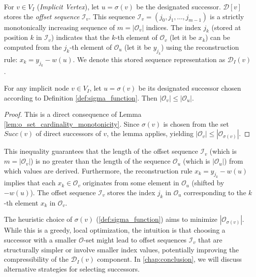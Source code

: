For $v \in V_I$ (\emph{Implicit Vertex}), let $u = \sigma(v)$ be the designated successor. $\mathcal{D}[v]$ stores the \emph{offset sequence} $\mathcal{I}_v$. This sequence $\mathcal{I}_v = (j_0, j_1, \dots, j_{m-1})$ is a strictly monotonically increasing sequence of $m = |\mathcal{O}_v|$ indices. The index $j_k$ (stored at position $k$ in $\mathcal{I}_v$) indicates that the $k$-th element of $\mathcal{O}_v$ (let it be $x_k$) can be computed from the $j_k$-th element of $\mathcal{O}_u$ (let it be $y_{j_k}$) using the reconstruction rule: $x_k = y_{j_k} - w(u)$. We denote this stored sequence representation as $\mathcal{D}_I(v)$.


\begin{proposition}
    \label{prop:o_set_size_guarantee}
    For any implicit node $v \in V_I$, let $u = \sigma(v)$ be its designated successor chosen according to Definition \ref{def:sigma_function}. Then $|\mathcal{O}_v| \le |\mathcal{O}_u|$.
\end{proposition}
\begin{proof}
    This is a direct consequence of Lemma \ref{lem:o_set_cardinality_monotonicity}. Since $\sigma(v)$ is chosen from the set $Succ(v)$ of direct successors of $v$, the lemma applies, yielding $|\mathcal{O}_v| \le |\mathcal{O}_{\sigma(v)}|$.
\end{proof}
This inequality guarantees that the length of the offset sequence $\mathcal{I}_v$ (which is $m = |\mathcal{O}_v|$) is no greater than the length of the sequence $\mathcal{O}_u$ (which is $|\mathcal{O}_u|$) from which values are derived. Furthermore, the reconstruction rule $x_k = y_{j_k} - w(u)$ implies that each $x_k \in \mathcal{O}_v$ originates from some element in $\mathcal{O}_u$ (shifted by $-w(u)$). The offset sequence $\mathcal{I}_v$ stores the index $j_k$ in $\mathcal{O}_u$ corresponding to the $k$-th element $x_k$ in $\mathcal{O}_v$.

The heuristic choice of $\sigma(v)$ (\ref{def:sigma_function}) aims to minimize $|\mathcal{O}_{\sigma(v)}|$. While this is a greedy, local optimization, the intuition is that choosing a successor with a smaller $\mathcal{O}$-set might lead to offset sequences $\mathcal{I}_v$ that are structurally simpler or involve smaller index values, potentially improving the compressibility of the $\mathcal{D}_I(v)$ component. In \autoref{chap:conclusion}, we will discuss alternative strategies for selecting successors.

